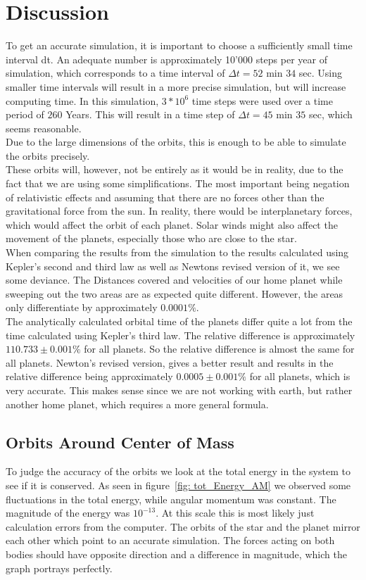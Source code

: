 \documentclass[reprint,english,notitlepage]{revtex4-2}
\begin{document}
\section{Discussion}
To get an accurate simulation, it is important to choose a sufficiently small time interval dt.
An adequate number is approximately 10'000 steps per year of simulation, which corresponds to a time interval of $\Delta t = 52$ min $34$ sec.
Using smaller time intervals will result in a more precise simulation, but will increase computing time.
In this simulation, $3*10^6$ time steps were used over a time period of $260$ Years.
This will result in a time step of $\Delta t = 45$ min $35$ sec, which seems reasonable.\\
Due to the large dimensions of the orbits, this is enough to be able to simulate the orbits precisely.\\
These orbits will, however, not be entirely as it would be in reality, due to the fact that we are using some simplifications.
The most important being negation of relativistic effects and assuming that there are no forces other than the gravitational force from the sun.
In reality, there would be interplanetary forces, which would affect the orbit of each planet.
Solar winds might also affect the movement of the planets, especially those who are close to the star.\\
When comparing the results from the simulation to the results calculated using Kepler's second and third law as well as Newtons revised version of it, we see some deviance.
The Distances covered and velocities of our home planet while sweeping out the two areas are as expected quite different.
However, the areas only differentiate by approximately $0.0001\%$.\\

The analytically calculated orbital time of the planets differ quite a lot from the time calculated using Kepler's third law.
The relative difference is approximately $110.733 \pm 0.001\%$ for all planets.
So the relative difference is almost the same for all planets.
Newton's revised version, gives a better result and results in the relative difference being approximately $0.0005 \pm 0.001\%$ for all planets, which is very accurate.
This makes sense since we are not working with earth, but rather another home planet, which requires a more general formula.

\subsection{Orbits Around Center of Mass}
	To judge the accuracy of the orbits we look at the total energy in the system to see if it is conserved.
	As seen in figure~\ref{fig: tot_Energy_AM} we observed some fluctuations in the total energy, while angular momentum was constant.
	The magnitude of the energy was $ 10^{-13} $.
	At this scale this is most likely just calculation errors from the computer.
	The orbits of the star and the planet mirror each other which point to an accurate simulation.
	The forces acting on both bodies should have opposite direction and a difference in magnitude, which the graph portrays perfectly.
\end{document}
